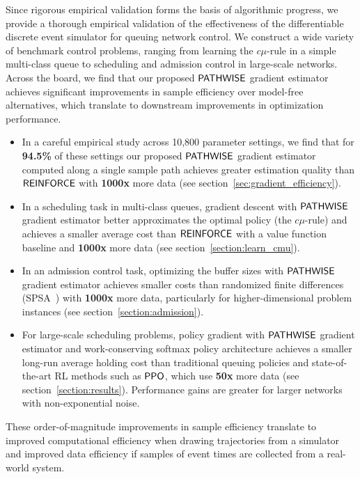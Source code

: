 Since rigorous empirical validation forms the basis of algorithmic progress, we provide a thorough empirical validation of the effectiveness of the differentiable discrete event simulator for queuing network control. We construct a wide variety of benchmark control problems, ranging from learning the $c\mu$-rule in a simple multi-class queue to scheduling and admission control in large-scale networks. Across the board, we find that our proposed $\mathsf{PATHWISE}$ gradient estimator achieves significant improvements in sample efficiency over model-free alternatives, which translate to downstream improvements in optimization performance.
\begin{itemize}[itemsep=0pt]
\item In a careful empirical study across 10,800 parameter settings, we find that for {\bf 94.5\%} of these settings our proposed $\mathsf{PATHWISE}$ gradient estimator computed along a single sample path achieves greater estimation quality than $\mathsf{REINFORCE}$ with {\bf 1000x} more data (see section~\ref{sec:gradient_efficiency}).
\item In a scheduling task in multi-class queues, gradient descent with $\mathsf{PATHWISE}$ gradient estimator better approximates the optimal policy (the $c\mu$-rule) and achieves a smaller average cost than $\mathsf{REINFORCE}$ with a value function baseline and {\bf 1000x} more data (see section~\ref{section:learn_cmu}).
\item In an admission control task, optimizing the buffer sizes with $\mathsf{PATHWISE}$ gradient estimator achieves smaller costs than randomized finite differences (SPSA~\cite{spall1992multivariate}) with {\bf 1000x} more data, particularly for higher-dimensional problem instances (see section~\ref{section:admission}).
\item For large-scale scheduling problems, policy gradient with $\mathsf{PATHWISE}$ gradient estimator and work-conserving softmax policy architecture achieves a smaller long-run average holding cost than traditional queuing policies
and state-of-the-art RL methods such as $\mathsf{PPO}$, which use {\bf 50x} more data (see section~\ref{section:results}). Performance gains are greater for larger networks with non-exponential noise.
\end{itemize}
These order-of-magnitude improvements in sample efficiency translate to improved computational efficiency when drawing trajectories from a simulator and improved data efficiency if samples of event times are collected from a real-world system.

